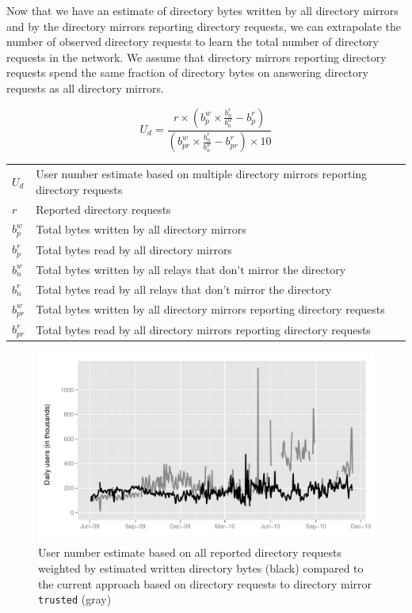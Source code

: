 \documentclass{article}
\begin{document}
Now that we have an estimate of directory bytes written by all directory
mirrors and by the directory mirrors reporting directory requests, we can
extrapolate the number of observed directory requests to learn the total
number of directory requests in the network.
We assume that directory mirrors reporting directory requests spend the
same fraction of directory bytes on answering directory requests as all
directory mirrors.

\begin{equation}
U_d = \frac{r \times (b^w_p \times \frac{b^r_n}{b^w_n} - b^r_p)}{(b^w_{pr} \times \frac{b^r_n}{b^w_n} - b^r_{pr}) \times 10}
\end{equation}

\begin{center}
\begin{tabular}{p{0.75cm}p{9cm}}
$U_d$ & User number estimate based on multiple directory mirrors reporting
directory requests\\
$r$ & Reported directory requests\\
$b^w_p$ & Total bytes written by all directory mirrors\\
$b^r_p$ & Total bytes read by all directory mirrors\\
$b^w_n$ & Total bytes written by all relays that don't mirror the
directory\\
$b^r_n$ & Total bytes read by all relays that don't mirror the directory\\
$b^w_{pr}$ & Total bytes written by all directory mirrors reporting
directory requests\\
$b^r_{pr}$ & Total bytes read by all directory mirrors reporting directory
requests\\
\end{tabular}
\end{center}

\begin{figure}[t]
\includegraphics[width=\textwidth]{estimated-users.pdf}
\caption{User number estimate based on all reported directory requests
weighted by estimated written directory bytes (black) compared to the
current approach based on directory requests to directory mirror
\texttt{trusted} (gray)}
\label{fig:estimated-users}
\end{figure}
\end{document}
